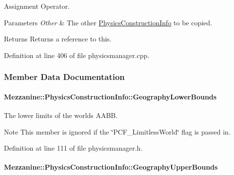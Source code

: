 Assignment Operator. 


\begin{DoxyParams}{Parameters}
{\em Other} & The other \hyperlink{classMezzanine_1_1PhysicsConstructionInfo}{PhysicsConstructionInfo} to be copied. \\
\hline
\end{DoxyParams}
\begin{DoxyReturn}{Returns}
Returns a reference to this. 
\end{DoxyReturn}


Definition at line 406 of file physicsmanager.cpp.



\subsubsection{Member Data Documentation}
\hypertarget{classMezzanine_1_1PhysicsConstructionInfo_aed6f8f0555fe4dec58758f6d774cbcee}{
\paragraph[{GeographyLowerBounds}]{ {\bf Mezzanine::PhysicsConstructionInfo::GeographyLowerBounds}}\hfill}
\label{classMezzanine_1_1PhysicsConstructionInfo_aed6f8f0555fe4dec58758f6d774cbcee}


The lower limits of the worlds AABB. 

\begin{DoxyNote}{Note}
This member is ignored if the \char`\"{}PCF\_\-LimitlessWorld\char`\"{} flag is passed in. 
\end{DoxyNote}


Definition at line 111 of file physicsmanager.h.

\hypertarget{classMezzanine_1_1PhysicsConstructionInfo_aa1794e928aea2ce5f2e9ad4f467b1c14}{
\paragraph[{GeographyUpperBounds}]{ {\bf Mezzanine::PhysicsConstructionInfo::GeographyUpperBounds}}\hfill}
\label{classMezzanine_1_1PhysicsConstructionInfo_aa1794e928aea2ce5f2e9ad4f467b1c14}


